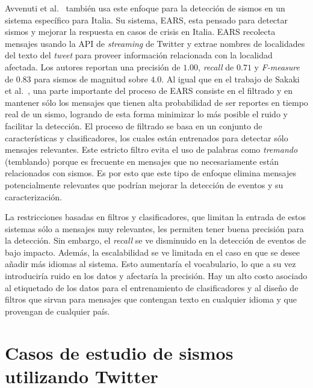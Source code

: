 Avvenuti et al.~\cite{avvenuti2014earthquake, avvenuti2014ears} también usa este enfoque para la detección de sismos en un sistema específico para Italia.
%
Su sistema, EARS, esta pensado para detectar sismos y mejorar la respuesta en casos de crisis en Italia.
%
EARS recolecta mensajes usando la API de \textit{streaming} de Twitter y extrae nombres de localidades del texto del {\em tweet} para proveer información relacionada con la localidad afectada.
%
Los autores reportan una precisión de $1.00$, {\em recall} de $0.71$ y {\em F-measure} de $0.83$ para sismos  de magnitud sobre $4.0$. 
%
Al igual que en el trabajo de Sakaki et al.~\cite{sakaki2013tweet}, una parte importante del proceso de EARS consiste en el filtrado y en mantener sólo los mensajes que tienen alta probabilidad de ser reportes en tiempo real de un sismo, logrando de esta forma minimizar lo más posible el ruido y facilitar la detección.
%
El proceso de filtrado se basa en un conjunto de características y clasificadores, los cuales están entrenados para detectar sólo mensajes relevantes. 
%
Este estricto filtro evita el uso de palabras como \textit{tremando} (temblando) porque es frecuente en mensajes que no necesariamente están relacionados con sismos. 
%
Es por esto que este tipo de enfoque elimina mensajes potencialmente relevantes que podrían mejorar la detección de eventos y su caracterización.  


La restricciones basadas en filtros y clasificadores, que limitan la entrada de estos sistemas sólo a mensajes muy relevantes, les permiten tener buena precisión para la detección. 
%
Sin embargo, el \textit{recall} se ve disminuido en la detección de eventos de bajo impacto. 
%
Además, la escalabilidad se ve limitada en el caso en que se desee añadir más idiomas al sistema. 
%
Esto aumentaría el vocabulario, lo que a su vez introduciría ruido en los datos y afectaría la precisión. 
%
Hay un alto costo asociado al etiquetado de los datos para el entrenamiento de clasificadores y al diseño de filtros que sirvan para mensajes que contengan texto en cualquier idioma y que provengan de cualquier país.

\section{Casos de estudio de sismos utilizando Twitter}
\label{sec:otroscasos}

